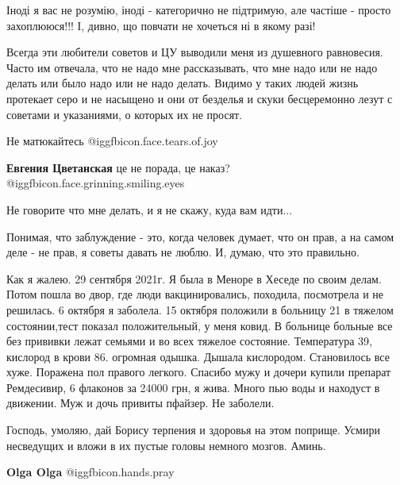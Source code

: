 \begin{itemize}

Іноді я вас не розумію, іноді - категорично не підтримую, але частіше - просто
захоплююся!!! І, дивно, що повчати не хочеться ні в якому разі!


Всегда эти любители советов и ЦУ выводили меня из душевного равновесия. Часто
им отвечала, что не надо мне рассказывать, что мне надо или не надо делать или
было надо или не надо делать. Видимо у таких людей жизнь протекает серо и не
насыщено и они от безделья и скуки бесцеремонно лезут с советами и указаниями,
о которых их не просят.


Не матюкайтесь @igg{fbicon.face.tears.of.joy} 

\begin{itemize} %
\textbf{Евгения Цветанская} це не порада, це наказ? @igg{fbicon.face.grinning.smiling.eyes} 
\end{itemize} %

Не говорите что мне делать, и я не скажу, куда вам идти...


Понимая, что заблуждение - это, когда человек думает, что он прав, а на самом деле - не прав, я советы давать не люблю.
И, думаю, что это правильно.


Как я жалею. 29 сентября 2021г. Я была в Меноре в Хеседе по своим делам. Потом
пошла во двор, где люди вакцинировались, походила, посмотрела и не решилась. 6
октября я заболела. 15 октября положили в больницу 21 в тяжелом состоянии,тест
показал положительный, у меня ковид. В больнице больные все без прививки лежат
семьями и во всех тяжелое состояние. Температура 39, кислород в крови 86.
огромная одышка. Дышала кислородом. Становилось все хуже. Поражена пол правого
легкого. Спасибо мужу и дочери купили препарат Ремдесивир, 6 флаконов за 24000
грн, я жива. Много пью воды и находуст в движении. Муж и дочь привиты пфайзер.
Не заболели.


Господь, умоляю, дай Борису терпения и здоровья на этом поприще. Усмири
несведущих и вложи в их пустые головы немного мозгов. Аминь.

\textbf{Olga Olga}  @igg{fbicon.hands.pray} 



\end{itemize}
